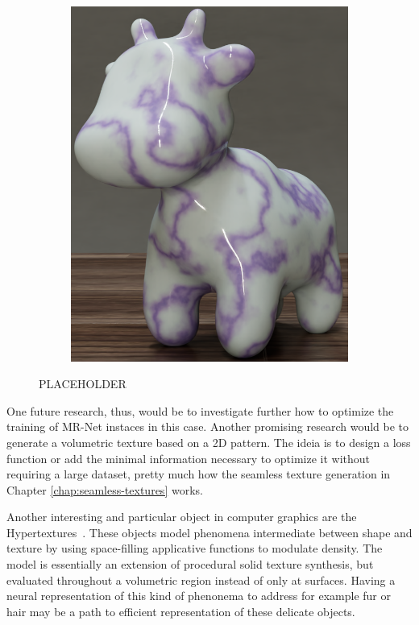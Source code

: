 \begin{figure}[h]
\begin{subfigure}[b]{0.32\textwidth}
       \includegraphics[width=\textwidth]{img/ch7/spot_mrnet.0101.png}
       \caption{}
   \end{subfigure}
   \caption{PLACEHOLDER}
   \label{f:volumetric-texture}
\end{figure}

One future research, thus, would be to investigate further how to optimize the training of MR-Net instaces in this case. Another promising research would be to generate a volumetric texture based on a 2D pattern. The ideia is to design a loss function or add the minimal information necessary to optimize it without requiring a large dataset, pretty much how the seamless texture generation in Chapter \ref{chap:seamless-textures} works.

Another interesting and particular object in computer graphics are the Hypertextures~\citep{hypertext}. These objects model phenomena intermediate between shape and texture by using space-filling applicative functions to modulate density. The model is essentially an extension of procedural solid texture synthesis, but evaluated throughout a volumetric region instead of only at surfaces. Having a neural representation of this kind of phenonema to address for example fur or hair may be a path to efficient representation of these delicate objects.


